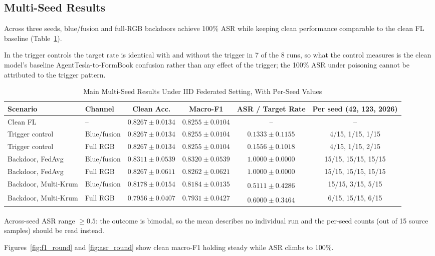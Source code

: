 \documentclass[conference]{IEEEtran}
\begin{document}
\subsection{Multi-Seed Results}

Across three seeds, blue/fusion and full-RGB backdoors achieve 100\% ASR while keeping clean performance comparable to the clean FL baseline (Table~\ref{tab:main}). 

In the trigger controls the target rate is identical with and without the trigger in 7 of the 8 runs, so what the control measures is the clean model's baseline AgentTesla-to-FormBook confusion rather than any effect of the trigger; the 100\% ASR under poisoning cannot be attributed to the trigger pattern.

\begin{table}[h]
	\caption{Main Multi-Seed Results Under IID Federated Setting, With Per-Seed Values}
	\label{tab:main}
	\centering
	\footnotesize
	\setlength{\tabcolsep}{5pt}
	\begin{tabular}{llcccc}
		\toprule
		\textbf{Scenario} & \textbf{Channel} & \textbf{Clean Acc.} & \textbf{Macro-F1} & \textbf{ASR / Target Rate} & \textbf{Per seed (42, 123, 2026)} \\
		\midrule
		Clean FL & -- & $0.8267 \pm 0.0134$ & $0.8255 \pm 0.0104$ & -- & -- \\
		Trigger control & Blue/fusion & $0.8267 \pm 0.0134$ & $0.8255 \pm 0.0104$ & $0.1333 \pm 0.1155$ & 4/15, 1/15, 1/15 \\
		Trigger control & Full RGB & $0.8267 \pm 0.0134$ & $0.8255 \pm 0.0104$ & $0.1556 \pm 0.1018$ & 4/15, 1/15, 2/15 \\
		Backdoor, FedAvg & Blue/fusion & $0.8311 \pm 0.0539$ & $0.8320 \pm 0.0539$ & $1.0000 \pm 0.0000$ & 15/15, 15/15, 15/15 \\
		Backdoor, FedAvg & Full RGB & $0.8267 \pm 0.0611$ & $0.8262 \pm 0.0621$ & $1.0000 \pm 0.0000$ & 15/15, 15/15, 15/15 \\
		\midrule
		Backdoor, Multi-Krum & Blue/fusion & $0.8178 \pm 0.0154$ & $0.8184 \pm 0.0135$ & $0.5111 \pm 0.4286$\textsuperscript{\dag} & 15/15, 3/15, 5/15 \\
		Backdoor, Multi-Krum & Full RGB & $0.7956 \pm 0.0407$ & $0.7931 \pm 0.0427$ & $0.6000 \pm 0.3464$\textsuperscript{\dag} & 6/15, 15/15, 6/15 \\
		\bottomrule
	\end{tabular}

	\vspace{2pt}
	\begin{minipage}{\textwidth}
		\footnotesize\raggedright
		\textsuperscript{\dag}Across-seed ASR range $\geq 0.5$: the outcome is bimodal, so the mean describes no individual run and the per-seed counts (out of 15 source samples) should be read instead.
	\end{minipage}
\end{table}
Figures~\ref{fig:f1_round} and \ref{fig:asr_round} show clean macro-F1 holding steady while ASR climbs to 100\%.
\end{document}

